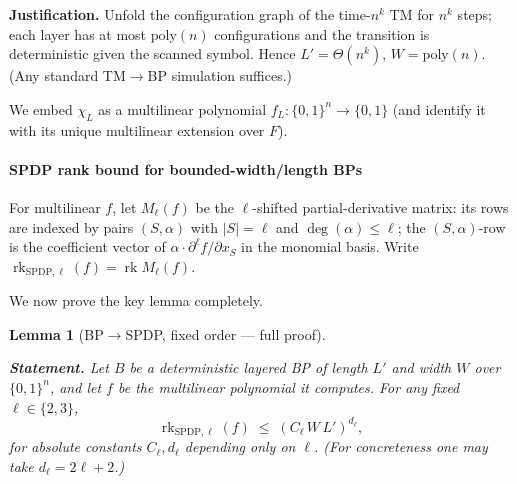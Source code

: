 \documentclass[12pt]{article}
\newtheorem{lemma}[theorem]{Lemma}
\theoremstyle{definition}
\theoremstyle{definition}
\theoremstyle{remark}
\theoremstyle{remark}
\begin{document}
\textbf{Justification.} Unfold the configuration graph of the time-$n^k$ TM for $n^k$ steps; each layer has at most $\mathrm{poly}(n)$ configurations and the transition is deterministic given the scanned symbol. Hence $L' = \Theta(n^k)$, $W = \mathrm{poly}(n)$. (Any standard TM$\to$BP simulation suffices.)

We embed $\chi_L$ as a multilinear polynomial $f_L : \{0,1\}^n \to \{0,1\}$ (and identify it with its unique multilinear extension over $F$).

\paragraph{SPDP rank bound for bounded-width/length BPs}

For multilinear $f$, let $M_\ell(f)$ be the $\ell$-shifted partial-derivative matrix: its rows are indexed by pairs $(S,\alpha)$ with $|S| = \ell$ and $\deg(\alpha) \le \ell$; the $(S,\alpha)$-row is the coefficient vector of $\alpha \cdot \partial^\ell f/\partial x_S$ in the monomial basis. Write $\operatorname{rk}_{\mathrm{SPDP},\ell}(f) = \operatorname{rk} M_\ell(f)$.

We now prove the key lemma completely.

\begin{lemma}[BP$\to$SPDP, fixed order --- full proof]\label{lem:bp-spdp}

\textbf{Statement.}
Let $B$ be a deterministic layered BP of length $L'$ and width $W$ over $\{0,1\}^n$, and let $f$ be the multilinear polynomial it computes. For any fixed $\ell \in \{2,3\}$,
\[
\operatorname{rk}_{\mathrm{SPDP},\ell}(f) \;\le\; (C_\ell\, W\, L')^{d_\ell},
\]
for absolute constants $C_\ell, d_\ell$ depending only on $\ell$. (For concreteness one may take $d_\ell = 2\ell+2$.)
\end{lemma}
\end{document}
